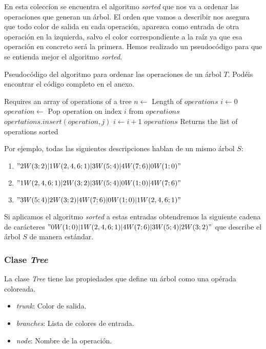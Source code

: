 \documentclass[../main.tex]{subfiles}
\begin{document}
En esta colecc\'ion se encuentra el algoritmo \emph{sorted} que nos va a ordenar las operaciones que generan un \'arbol. El orden que vamos a describir nos asegura que todo color de salida en cada operaci\'on, aparezca como entrada de otra operaci\'on en la izquierda, salvo el color correspondiente a la ra\'iz ya que esa operaci\'on en concreto ser\'a la primera.
Hemos realizado un pseudoc\'odigo para que se entienda mejor el algoritmo \emph{sorted}.

\begin{algorithm}
    \caption{Pseudoc\'odigo del algoritmo para ordenar las operaciones de un \'arbol $T$. Pod\'eis encontrar el c\'odigo completo en el anexo.}
    \begin{algorithmic}[1]
        \Require Requires an array of operations of a tree
        \State $n\leftarrow$ Length of $operations$
        \State $i\leftarrow 0$ 
        \For{$j$ in $[i+1,\dots,n)$}
        \State $operation\leftarrow$ Pop operation on index $i$ from $operations$
        \State $opertations.insert(operation,j)$ 
        \State\Break
        \EndIf
        \EndFor
        \ForElse {}
        \State $i \leftarrow i+1$
        \EndForElse
        \EndWhile
        \State\Return $operations$
        \EndFunction
        \Ensure Returns the list of operations sorted
    \end{algorithmic}
\end{algorithm}

Por ejemplo, todas las siguientes descripciones hablan de un mismo \'arbol $S$:
\begin{enumerate}
    \item $"2W(3;2)|1W(2,4,6;1)|3W(5;4)|4W(7;6)|0W(1;0)"$
    \item $"1W(2,4,6;1)|2W(3;2)|3W(5;4)|0W(1;0)|4W(7;6)"$
    \item $"3W(5;4)|2W(3;2)|4W(7;6)|0W(1;0)|1W(2,4,6;1)"$
\end{enumerate}
Si aplicamos el algoritmo \emph{sorted} a estas entradas obtendremos la siguiente cadena de car\'acteres $"0W(1;0)|1W(2,4,6;1)|4W(7;6)|3W(5;4)|2W(3;2)"$ que describe el \'arbol $S$ de manera est\'andar.




\subsubsection*{Clase \emph{Tree}}
La clase \emph{Tree} tiene las propiedades que define un \'arbol como una op\'erada coloreada.
\begin{itemize}
    \item \emph{trunk}: Color de salida.
    \item \emph{branches}: Lista de colores de entrada.
    \item \emph{node}: Nombre de la operaci\'on.
\end{itemize}
\end{document}
